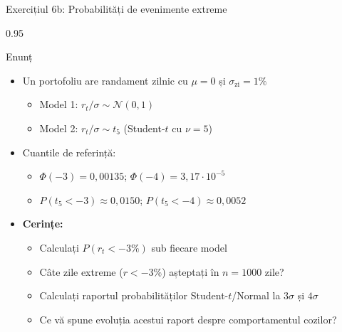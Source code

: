 \documentclass[9pt, aspectratio=169, t]{beamer}
\begin{document}

\begin{frame}[shrink=25]{Exercițiul 6b: Probabilități de evenimente extreme}
\begin{cminipage}{0.95\textwidth}
\begin{block}{Enunț}
\begin{itemize}\setlength{\itemsep}{0pt}
    \item Un portofoliu are randament zilnic cu $\mu = 0$ și $\sigma_{\text{zi}} = 1\%$
    \begin{itemize}\setlength{\itemsep}{0pt}
        \item Model 1: $r_t/\sigma \sim \mathcal{N}(0, 1)$
        \item Model 2: $r_t/\sigma \sim t_5$ (Student-$t$ cu $\nu = 5$)
    \end{itemize}
    \item Cuantile de referință:
    \begin{itemize}\setlength{\itemsep}{0pt}
        \item $\Phi(-3) = 0{,}00135$; $\Phi(-4) = 3{,}17 \cdot 10^{-5}$
        \item $P(t_5 < -3) \approx 0{,}0150$; $P(t_5 < -4) \approx 0{,}0052$
    \end{itemize}
    \item \textbf{Cerințe:}
    \begin{itemize}\setlength{\itemsep}{0pt}
        \item Calculați $P(r_t < -3\%)$ sub fiecare model
        \item Câte zile extreme ($r < -3\%$) așteptați în $n = 1000$ zile?
        \item Calculați raportul probabilităților Student-$t$/Normal la $3\sigma$ și $4\sigma$
        \item Ce vă spune evoluția acestui raport despre comportamentul cozilor?
    \end{itemize}
\end{itemize}
\end{block}
\end{cminipage}
\end{frame}
\end{document}
